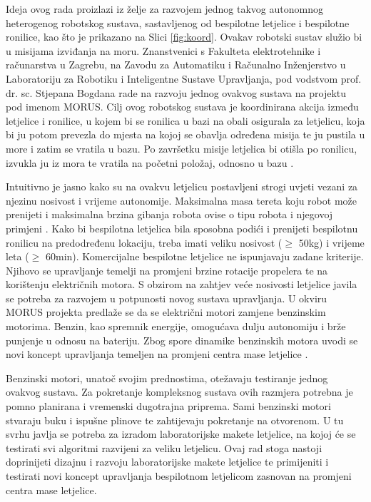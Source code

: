 \documentclass[11pt,a4paper]{article}
\begin{document}
Ideja ovog rada proizlazi iz želje za razvojem jednog takvog autonomnog heterogenog robotskog sustava, sastavljenog od bespilotne letjelice i bespilotne ronilice, kao što je prikazano na Slici \ref{fig:koord}. Ovakav robotski sustav služio bi u misijama izviđanja na moru. Znanstvenici s Fakulteta elektrotehnike i računarstva u Zagrebu, na Zavodu za Automatiku i Računalno Inženjerstvo u Laboratoriju za Robotiku i Inteligentne Sustave Upravljanja, pod vodstvom prof. dr. sc. Stjepana Bogdana rade na razvoju jednog ovakvog sustava na projektu pod imenom MORUS. Cilj ovog robotskog sustava je koordinirana akcija između letjelice i ronilice, u kojem bi se ronilica u bazi na obali osigurala za letjelicu, koja bi ju potom prevezla do mjesta na kojoj se obavlja određena misija te ju pustila u more i zatim se vratila u bazu. Po završetku misije letjelica bi otišla po ronilicu, izvukla ju iz mora te vratila na početni položaj, odnosno u bazu \cite{haus2}.


\medskip


Intuitivno je jasno kako su na ovakvu letjelicu postavljeni strogi uvjeti vezani za njezinu nosivost i vrijeme autonomije. Maksimalna masa tereta koju robot može prenijeti i maksimalna brzina gibanja robota ovise o tipu robota i njegovoj primjeni \cite{kova}. Kako bi bespilotna letjelica bila sposobna podići i prenijeti bespilotnu ronilicu na predodređenu lokaciju, treba imati veliku nosivost ($\geq$ 50kg) i vrijeme leta ($\geq$ 60min). Komercijalne bespilotne letjelice ne ispunjavaju zadane kriterije. Njihovo se upravljanje temelji na promjeni brzine rotacije propelera te na korištenju električnih motora. S obzirom na zahtjev veće nosivosti letjelice javila se potreba za razvojem u potpunosti novog sustava upravljanja. U okviru MORUS projekta predlaže se da se električni motori zamjene benzinskim motorima. Benzin, kao spremnik energije, omogućava dulju autonomiju i brže punjenje u odnosu na bateriju. Zbog spore dinamike benzinskih motora uvodi se novi koncept upravljanja temeljen na promjeni centra mase letjelice \cite{haus1}.

\medskip

Benzinski motori, unatoč svojim prednostima, otežavaju testiranje jednog ovakvog sustava. Za pokretanje kompleksnog sustava ovih razmjera potrebna je pomno planirana i vremenski dugotrajna priprema. Sami benzinski motori stvaraju buku i ispušne plinove te zahtijevaju pokretanje na otvorenom. U tu svrhu javlja se potreba za izradom laboratorijske makete letjelice, na kojoj će se testirati svi algoritmi razvijeni za veliku letjelicu. Ovaj rad stoga nastoji doprinijeti dizajnu i razvoju laboratorijske makete letjelice te primijeniti i testirati novi koncept upravljanja bespilotnom letjelicom zasnovan na promjeni centra mase letjelice. 
\end{document}
